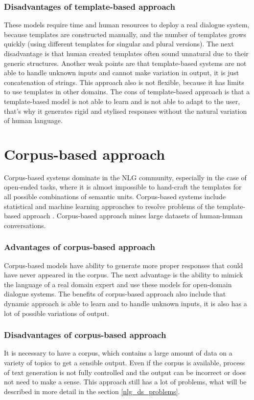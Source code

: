 \subsubsection{Disadvantages of template-based approach}
These models require time and human resources to deploy a real dialogue system, because templates are constructed manually, and the number of templates grows quickly (using different templates for singular and plural versions). The next disadvantage is that human created templates often sound unnatural due to their generic structures. Another weak points are that template-based systems are not able to handle unknown inputs and cannot make variation in output, it is just concatenation of strings. This approach also is not flexible, because it has limits to use templates in other domains. The cons of template-based approach is that a template-based model is not able to learn and is not able to adapt to the user, that's why it generates rigid and stylised responses without the natural variation of human language.

\section{Corpus-based approach}
Corpus-based systems dominate in the NLG community, especially in the case of open-ended tasks, where it is almost impossible to hand-craft the templates for all possible combinations of semantic units. Corpus-based systems include statistical and machine learning approaches to resolve problems of the template-based approach \cite{rudnicky2002dialog}. Corpus-based approach mines large datasets of human-human conversations.

\subsubsection{Advantages of corpus-based approach}
Corpus-based models have ability to generate more proper responses that could have never appeared in the corpus. The next advantage is the ability to mimick the language of a real domain expert and use these models for open-domain dialogue systems. The benefits of corpus-based approach also include that dynamic approach is able to learn and to handle unknown inputs, it is also has a lot of possible variations of output.

\subsubsection{Disadvantages of corpus-based approach}
It is necessary to have a corpus, which contains a large amount of data on a variety of topics to get a sensible output. Even if the corpus is available, process of text generation is not fully controlled and the output can be incorrect or does not need to make a sense. This approach still has a lot of problems, what will be described in more detail in the section \ref{nlg_ds_problems}. 


